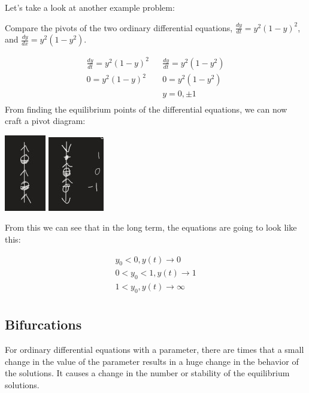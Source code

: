   Let's take a look at another example problem:

  \begin{problem}
    Compare the pivots of the two ordinary differential equations, $\frac{dy}{dt}=y^2(1-y)^2$, and $\frac{dy}{dx}=y^2(1-y^2)$.

    \begin{align}
      \frac{dy}{dt}=y^2(1-y)^2 && \frac{dy}{dt}=y^2(1-y^2)\\
      0=y^2(1-y)^2 && 0=y^2(1-y^2)\\
      && y=0,\pm1\\
    \end{align}
    From finding the equilibrium points of the differential equations, we can now craft a pivot diagram:\newline
    \begin{center}
    \includegraphics{resource/images/2.7 Example 2-1.jpg}
    \includegraphics{resource/images/2.7 Example 2-2.jpg}
    \end{center}

    From this we can see that in the long term, the equations are going to look like this:

    \begin{align}
      y_0<0,y(t)\to0\\
      0<y_0<1,y(t)\to1\\
      1<y_0,y(t)\to\infty\\
    \end{align}
  \end{problem}

  \subsection{Bifurcations}

  For ordinary differential equations with a parameter, there are times that a small change in the value of the parameter results in a huge change in the behavior of the solutions. It causes a change in the number or stability of the equilibrium solutions.

